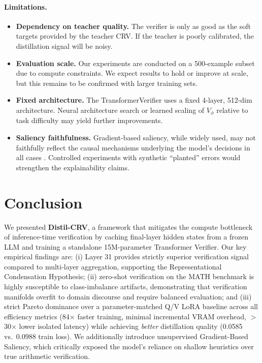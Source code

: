 \documentclass{article}
\begin{document}
\paragraph{Limitations.}
\begin{itemize}[topsep=2pt, itemsep=1pt]
  \item \textbf{Dependency on teacher quality.} The verifier is only as good as the soft targets provided by the teacher CRV. If the teacher is poorly calibrated, the distillation signal will be noisy.
  \item \textbf{Evaluation scale.} Our experiments are conducted on a 500-example subset due to compute constraints. We expect results to hold or improve at scale, but this remains to be confirmed with larger training sets.
  \item \textbf{Fixed architecture.} The TransformerVerifier uses a fixed 4-layer, 512-dim architecture. Neural architecture search or learned scaling of $V_\phi$ relative to task difficulty may yield further improvements.
  \item \textbf{Saliency faithfulness.} Gradient-based saliency, while widely used, may not faithfully reflect the causal mechanisms underlying the model's decisions in all cases \citep{jain2019attention}. Controlled experiments with synthetic ``planted'' errors would strengthen the explainability claims.
\end{itemize}

\section{Conclusion}
\label{sec:conclusion}

We presented \textbf{Distil-CRV}, a framework that mitigates the compute bottleneck of inference-time verification by caching final-layer hidden states from a frozen LLM and training a standalone 15M-parameter Transformer Verifier. Our key empirical findings are: (i) Layer 31 provides strictly superior verification signal compared to multi-layer aggregation, supporting the Representational Condensation Hypothesis; (ii) zero-shot verification on the MATH benchmark is highly susceptible to class-imbalance artifacts, demonstrating that verification manifolds overfit to domain discourse and require balanced evaluation; and (iii) strict Pareto dominance over a parameter-matched Q/V LoRA baseline across all efficiency metrics (84$\times$ faster training, minimal incremental VRAM overhead, $>$30$\times$ lower isolated latency) while achieving \emph{better} distillation quality (0.0585 vs.\ 0.0988 train loss). We additionally introduce unsupervised Gradient-Based Saliency, which critically exposed the model's reliance on shallow heuristics over true arithmetic verification.
\end{document}
